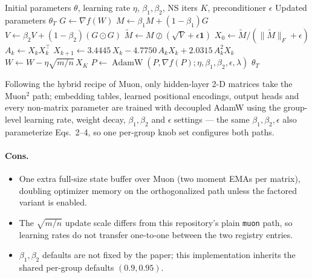 \begin{algorithm}[H]
\caption{Muon² (Second-Moment Preconditioned Orthogonalization)}
\label{alg:muon2}
\begin{algorithmic}[1]
\Require Initial parameters $\theta$, learning rate $\eta$, $\beta_1, \beta_2$, NS iters $K$, preconditioner $\epsilon$
\Ensure Updated parameters $\theta_T$
        \State $G \gets \nabla f(W)$ 
        \State $M \gets \beta_1 M + (1-\beta_1) G$ 
        \State $V \gets \beta_2 V + (1-\beta_2) (G \odot G)$ 
        \State $\widetilde{M} \gets M \oslash (\sqrt{V} + \epsilon\mathbf{1})$ 
        \State $X_0 \gets \widetilde{M} / (\|\widetilde{M}\|_F + \epsilon)$ 
            \State $A_k \gets X_k X_k^\top$ 
            \State $X_{k+1} \gets 3.4445\,X_k - 4.7750\,A_k X_k + 2.0315\,A_k^2 X_k$ 
        \EndFor
        \State $W \gets W - \eta \sqrt{m/n}\, X_K$ 
    \Else
        \State $P \gets \operatorname{AdamW}(P, \nabla f(P); \eta, \beta_1, \beta_2, \epsilon, \lambda)$ 
    \EndIf
\EndFor
\Return $\theta_T$
\end{algorithmic}
\end{algorithm}

Following the hybrid recipe of Muon, only hidden-layer 2-D matrices take the Muon$^2$
path; embedding tables, learned positional encodings, output heads and every non-matrix
parameter are trained with decoupled AdamW using the group-level learning rate, weight
decay, $\beta_1, \beta_2$ and $\epsilon$ settings --- the same $\beta_1, \beta_2, \epsilon$
also parameterize Eqs.~2--4, so one per-group knob set configures both paths.

\paragraph{Cons.}
\begin{itemize}[leftmargin=*]
\item One extra full-size state buffer over Muon (two moment EMAs per matrix), doubling
optimizer memory on the orthogonalized path unless the factored variant is enabled.
\item The $\sqrt{m/n}$ update scale differs from this repository's plain \texttt{muon}
path, so learning rates do not transfer one-to-one between the two registry entries.
\item $\beta_1, \beta_2$ defaults are not fixed by the paper; this implementation inherits
the shared per-group defaults $(0.9, 0.95)$.
\end{itemize}

